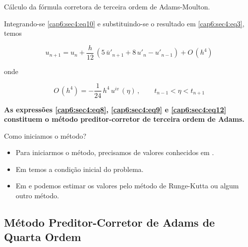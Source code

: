 \begin{enumerar}
\item Cálculo da fórmula corretora de terceira ordem de Adams-Moulton.

Integrando-se \ref{cap6:sec4:eq10} e substituindo-se o resultado em \ref{cap6:sec4:eq3}, temos

\begin{equation}
 \label{cap6:sec4:eq12}
 u_{n+1} = u_n + \frac{h}{12} \, (5 \, \bar{u}'_{n+1} + 8 \, u'_n - u'_{n-1}) + O \, (h^4)
\end{equation}

onde

\begin{equation}
 \label{cap6:sec4:eq13}
 O \, (h^4) = - \frac{1}{24} \, h^4 \, u^{iv} \, (\eta) \, , \qquad t_{n-1} < \eta < t_{n+1}
\end{equation}

\textbf{As expressões \ref{cap6:sec4:eq8}, \ref{cap6:sec4:eq9} e \ref{cap6:sec4:eq12} constituem o método preditor-corretor de terceira ordem de Adams.}

\item Como iniciamos o método?

\begin{itemize}

\item Para iniciarmos o método, precisamos de valores conhecidos em .

\item Em  temos a condição inicial do problema.

\item Em  e  podemos estimar os valores pelo método de Runge-Kutta ou algum outro método.

\end{itemize}

\end{enumerar}

\subsection{Método Preditor-Corretor de Adams de Quarta Ordem}

